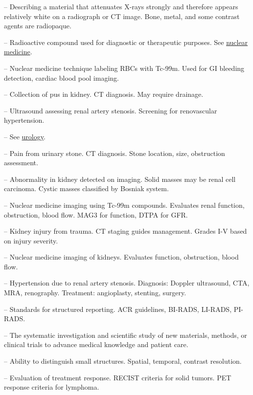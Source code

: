 -- Describing a material that attenuates X-rays strongly and therefore appears relatively white on a radiograph or CT image. Bone, metal, and some contrast agents are radiopaque.

-- Radioactive compound used for diagnostic or therapeutic purposes. See \hyperlink{Nuclear Medicine}{nuclear medicine}.

-- Nuclear medicine technique labeling RBCs with Tc-99m. Used for GI bleeding detection, cardiac blood pool imaging.

-- Collection of pus in kidney. CT diagnosis. May require drainage.

-- Ultrasound assessing renal artery stenosis. Screening for renovascular hypertension.


-- See \hyperlink{Urology}{urology}.

-- Pain from urinary stone. CT diagnosis. Stone location, size, obstruction assessment.

-- Abnormality in kidney detected on imaging. Solid masses may be renal cell carcinoma. Cystic masses classified by Bosniak system.

-- Nuclear medicine imaging using Tc-99m compounds. Evaluates renal function, obstruction, blood flow. MAG3 for function, DTPA for GFR.

-- Kidney injury from trauma. CT staging guides management. Grades I-V based on injury severity.

-- Nuclear medicine imaging of kidneys. Evaluates function, obstruction, blood flow.

-- Hypertension due to renal artery stenosis. Diagnosis: Doppler ultrasound, CTA, MRA, renography. Treatment: angioplasty, stenting, surgery.

-- Standards for structured reporting. ACR guidelines, BI-RADS, LI-RADS, PI-RADS.

-- The systematic investigation and scientific study of new materials, methods, or clinical trials to advance medical knowledge and patient care.

-- Ability to distinguish small structures. Spatial, temporal, contrast resolution.

-- Evaluation of treatment response. RECIST criteria for solid tumors. PET response criteria for lymphoma.

